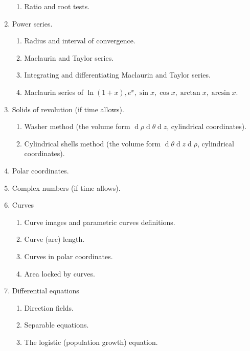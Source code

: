 \documentclass{article}
\begin{document}
\begin{enumerate}
\begin{enumerate}
\item Ratio and root tests.
\end{enumerate}
\item Power series.
\begin{enumerate}
\item Radius and interval of convergence.
\item Maclaurin and Taylor series.
\item Integrating and differentiating Maclaurin and Taylor series. 
\item Maclaurin series of $\ln(1+x), e^x, \sin x, \cos x, \arctan x, \arcsin x$.
\end{enumerate}
\item Solids of revolution (if time allows).
\begin{enumerate}
\item Washer method (the volume form $\operatorname{d}\rho \operatorname{d}\theta \operatorname{d} z$, cylindrical coordinates).
\item Cylindrical shells method (the volume form $ \operatorname{d}\theta \operatorname{d} z \operatorname{d}\rho$, cylindrical coordinates).
\end{enumerate}
\item Polar coordinates.
\item Complex numbers (if time allows).
\item Curves
\begin{enumerate}
\item Curve images and parametric curves definitions.
\item Curve (arc) length.
\item Curves in polar coordinates.
\item Area locked by curves.
\end{enumerate}
\item Differential equations
\begin{enumerate}
\item Direction fields.
\item Separable equations.
\item The logistic (population growth) equation.
\end{enumerate}

\end{enumerate}
\end{document}
